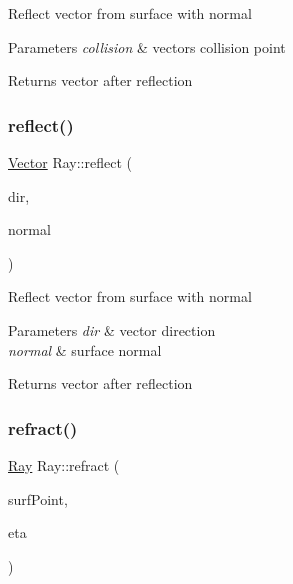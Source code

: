 Reflect vector from surface with normal 
\begin{DoxyParams}{Parameters}
{\em collision} & vector\textquotesingle{}s collision point \\
\hline
\end{DoxyParams}
\begin{DoxyReturn}{Returns}
vector after reflection 
\end{DoxyReturn}
\mbox{\label{class_ray_a411c500da66cd92a3a24807aba2015ae}} 
\subsubsection{\texorpdfstring{reflect()}{reflect()}\hspace{0.1cm}{\footnotesize\ttfamily [2/2]}}
{\footnotesize\ttfamily \mbox{\hyperlink{struct_vector}{Vector}} Ray\+::reflect (\begin{DoxyParamCaption}\item[{const \mbox{\hyperlink{struct_vector}{Vector}} \&}]{dir,  }\item[{const \mbox{\hyperlink{struct_vector}{Vector}} \&}]{normal }\end{DoxyParamCaption})\hspace{0.3cm}{\ttfamily [inline]}}

Reflect vector from surface with normal 
\begin{DoxyParams}{Parameters}
{\em dir} & vector direction \\
\hline
{\em normal} & surface normal \\
\hline
\end{DoxyParams}
\begin{DoxyReturn}{Returns}
vector after reflection 
\end{DoxyReturn}
\mbox{\label{class_ray_ab4723a206318cb11e98b487c324912df}} 
\subsubsection{\texorpdfstring{refract()}{refract()}\hspace{0.1cm}{\footnotesize\ttfamily [1/2]}}
{\footnotesize\ttfamily \mbox{\hyperlink{class_ray}{Ray}} Ray\+::refract (\begin{DoxyParamCaption}\item[{const \mbox{\hyperlink{class_surface_point}{Surface\+Point}} \&}]{surf\+Point,  }\item[{float}]{eta }\end{DoxyParamCaption})\hspace{0.3cm}{\ttfamily [inline]}}

